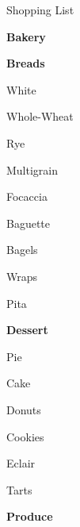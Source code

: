 \documentclass[12pt]{article}
\newcommand{\SmallSep}{\vspace{0.5em}}
\newcommand{\StoreSection}[1]
	{\Large\textbf{\color{Purple} #1}\par
	\SmallSep\normalsize}
\newcommand{\StoreItem}[1]
	{\textbf{\color{RoyalBlue} #1}}
\begin{document}
\sffamily 

\begin{center} \Large Shopping List \normalsize \end{center}


\StoreSection{Bakery}

\StoreItem{Breads}
\begin{multicols}{4}
\begin{compactitem}[\color{RoyalBlue}$\Box$]
	\item White 
	\item Whole-Wheat
	\item Rye
	\item Multigrain
	\item Focaccia
	\item Baguette
	\item Bagels
	\item Wraps 
	\item Pita 
	\item \underline{\hspace{3cm}}
	\item \underline{\hspace{3cm}}
\end{compactitem}
\end{multicols}

\StoreItem{Dessert}
\begin{multicols}{4}
\begin{compactitem}[\color{RoyalBlue}$\Box$]
	\item Pie
	\item Cake
	\item Donuts
	\item Cookies 
	\item Eclair
	\item Tarts 
	\item \underline{\hspace{3cm}}
	\item \underline{\hspace{3cm}}
\end{compactitem}
\end{multicols}


\StoreSection{Produce}
\end{document}
